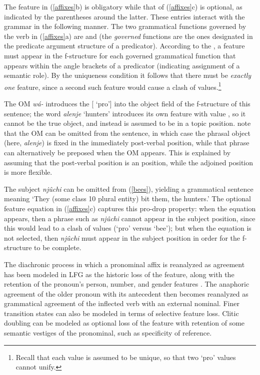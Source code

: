 \noindent
The  feature in (\ref{affixes}b) is obligatory while that of (\ref{affixes}c) is optional, as indicated by the parentheses around the latter.  These entries interact with the grammar in the following manner.  The two grammatical functions governed by the verb in (\ref{affixes}a) are  and  (the \textit{governed} functions are the ones designated in the predicate argument structure of a predicator).  According to the , a  feature must appear in the f-structure for each governed grammatical function that appears within the angle brackets of a predicator (indicating assignment of a semantic role).  By the uniqueness condition it follows that there must be \textit{exactly one}  feature, since a second such feature would cause a clash of values.\footnote{Recall that each  value is assumed to be unique, so that two `{pro}' values cannot unify.}  

The OM {\it w\'{a}-} introduces the [ `{pro}'] into the object field of the f-structure of this sentence; the word \textit{alenje} `hunters' introduces its own  feature with value , so it cannot be the true object, and instead is assumed to be in a topic position.  \citet[744--745]{bresnan+mchombo:1987} note that the OM can be omitted from the sentence, in which case the phrasal object (here, \textit{alenje}) is fixed in the immediately post-verbal position, while that phrase can alternatively be preposed when the OM appears.  This is explained by assuming that the post-verbal position is an  position, while the adjoined  position is more flexible.  

The subject \textit{nj\^{u}chi} can be omitted from (\ref{bees}), yielding a grammatical sentence meaning `They (some class 10 plural entity) bit them, the hunters.'  The optional  feature equation in (\ref{affixes}c) captures this pro-drop property: when the equation appears, then a phrase such as \textit{nj\^{u}chi} cannot appear in the subject position, since this would lead to a clash of  values 
(`{pro}' versus `{bee}'); but when the equation is not selected, then  \textit{nj\^{u}chi} must appear in the subject position in order for the f-structure to be complete.  

The diachronic process in which a pronominal affix is reanalyzed as agreement has been modeled in LFG as the historic loss of the  feature, along with the retention of the pronoun's person, number, and gender features \citep{coppock+wechsler:2010}.  The anaphoric agreement of the older pronoun with its antecedent then becomes reanalyzed as grammatical agreement of the inflected verb with an external nominal.  Finer transition states can also be modeled in terms of selective feature loss.  Clitic doubling can be modeled as optional loss of the  feature with retention of some semantic vestiges of the pronominal, such as specificity of reference.

